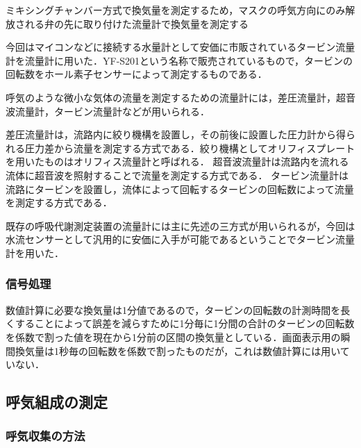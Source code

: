 ミキシングチャンバー方式で換気量を測定するため，マスクの呼気方向にのみ解放される弁の先に取り付けた流量計で換気量を測定する

今回はマイコンなどに接続する水量計として安価に市販されているタービン流量計を流量計に用いた．YF-S201という名称で販売されているもので，タービンの回転数をホール素子センサーによって測定するものである．

呼気のような微小な気体の流量を測定するための流量計には，差圧流量計，超音波流量計，タービン流量計などが用いられる．

差圧流量計は，流路内に絞り機構を設置し，その前後に設置した圧力計から得られる圧力差から流量を測定する方式である．絞り機構としてオリフィスプレートを用いたものはオリフィス流量計と呼ばれる．
超音波流量計は流路内を流れる流体に超音波を照射することで流量を測定する方式である．
タービン流量計は流路にタービンを設置し，流体によって回転するタービンの回転数によって流量を測定する方式である．



既存の呼吸代謝測定装置の流量計には主に先述の三方式が用いられるが，今回は水流センサーとして汎用的に安価に入手が可能であるということでタービン流量計を用いた．

\subsubsection{信号処理}

数値計算に必要な換気量は1分値であるので，タービンの回転数の計測時間を長くすることによって誤差を減らすために1分毎に1分間の合計のタービンの回転数を係数で割った値を現在から1分前の区間の換気量としている．画面表示用の瞬間換気量は1秒毎の回転数を係数で割ったものだが，これは数値計算には用いていない．

\subsection{呼気組成の測定}

\subsubsection{呼気収集の方法}

